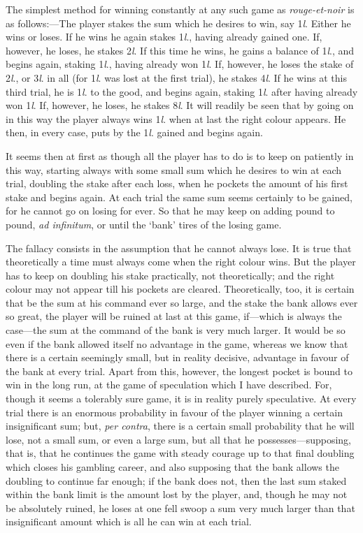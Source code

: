 \documentclass[letterpaper,12pt,oneside,openany]{memoir}
\begin{document}
The simplest method for winning constantly at any
such game as \textit{rouge-et-noir} is as follows:---The player
stakes the sum which he desires to win, say 1\textit{l}. Either
he wins or loses. If he wins he again stakes 1\textit{l}.,
having already gained one. If, however, he loses, he
stakes 2\textit{l}. If this time he wins, he gains a balance
of 1\textit{l}., and begins again, staking 1\textit{l}., having already
won 1\textit{l}. If, however, he loses the stake of 2\textit{l}., or 3\textit{l}. in
all (for 1\textit{l}. was lost at the first trial), he stakes 4\textit{l}. If
he wins at this third trial, he is 1\textit{l}. to the good, and
begins again, staking 1\textit{l}. after having already won 1\textit{l}.
If, however, he loses, he stakes 8\textit{l}. It will readily be
seen that by going on in this way the player always
wins 1\textit{l}. when at last the right colour appears. He then,
in every case, puts by the 1\textit{l}. gained and begins again.

It seems then at first as though all the player has
to do is to keep on patiently in this way, starting always
with some small sum which he desires to win at
each trial, doubling the stake after each loss, when he
pockets the amount of his first stake and begins again.
At each trial the same sum seems certainly to be
gained, for he cannot go on losing for ever. So that he
may keep on adding pound to pound, \textit{ad infinitum}, or
until the `bank' tires of the losing game.

The fallacy consists in the assumption that he cannot
always lose. It is true that theoretically a time
must always come when the right colour wins. But
the player has to keep on doubling his stake practically,
not theoretically; and the right colour may not appear
till his pockets are cleared. Theoretically, too, it is
certain that be the sum at his command ever so large,
and the stake the bank allows ever so great, the player
will be ruined at last at this game, if---which is always
the case---the sum at the command of the bank is very
much larger. It would be so even if the bank allowed
itself no advantage in the game, whereas we know that
there is a certain seemingly small, but in reality decisive,
advantage in favour of the bank at every trial.
Apart from this, however, the longest pocket is bound
to win in the long run, at the game of speculation
which I have described. For, though it seems a tolerably
sure game, it is in reality purely speculative. At
every trial there is an enormous probability in favour of
the player winning a certain insignificant sum; but,
\textit{per contra}, there is a certain small probability that he
will lose, not a small sum, or even a large sum, but all
that he possesses---supposing, that is, that he continues
the game with steady courage up to that final doubling
which closes his gambling career, and also supposing
that the bank allows the doubling to continue far
enough; if the bank does not, then the last sum staked
within the bank limit is the amount lost by the player,
and, though he may not be absolutely ruined, he loses
at one fell swoop a sum very much larger than that
insignificant amount which is all he can win at each
trial.
\end{document}
